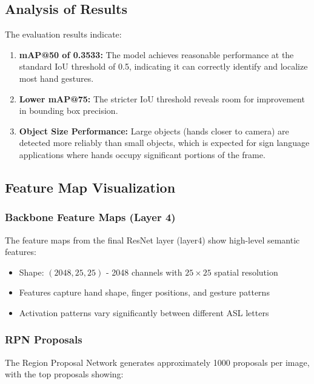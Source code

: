 \documentclass[12pt,a4paper]{article}
\begin{document}
\subsection{Analysis of Results}

The evaluation results indicate:

\begin{enumerate}
    \item \textbf{mAP@50 of 0.3533:} The model achieves reasonable performance at the standard IoU threshold of 0.5, indicating it can correctly identify and localize most hand gestures.
    
    \item \textbf{Lower mAP@75:} The stricter IoU threshold reveals room for improvement in bounding box precision.
    
    \item \textbf{Object Size Performance:} Large objects (hands closer to camera) are detected more reliably than small objects, which is expected for sign language applications where hands occupy significant portions of the frame.
\end{enumerate}

\subsection{Feature Map Visualization}

\subsubsection{Backbone Feature Maps (Layer 4)}

The feature maps from the final ResNet layer (layer4) show high-level semantic features:

\begin{itemize}
    \item Shape: $(2048, 25, 25)$ - 2048 channels with $25 \times 25$ spatial resolution
    \item Features capture hand shape, finger positions, and gesture patterns
    \item Activation patterns vary significantly between different ASL letters
\end{itemize}

\subsubsection{RPN Proposals}

The Region Proposal Network generates approximately 1000 proposals per image, with the top proposals showing:
\end{document}
